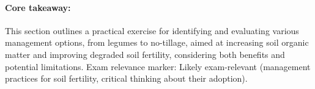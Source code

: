 \paragraph*{Core takeaway:} 
This section outlines a practical exercise for identifying and evaluating various management options, from legumes to no-tillage, aimed at increasing soil organic matter and improving degraded soil fertility, considering both benefits and potential limitations. Exam relevance marker: Likely exam-relevant (management practices for soil fertility, critical thinking about their adoption).

